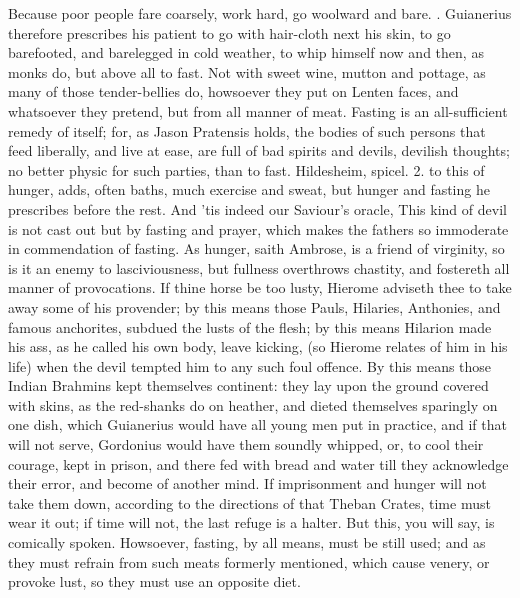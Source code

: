 Because poor people fare coarsely, work hard, go woolward and bare.
 . Guianerius
therefore prescribes his patient to go with hair-cloth next his skin,
to go barefooted, and barelegged in cold weather, to whip himself now
and then, as monks do, but above all to fast. Not with sweet wine,
mutton and pottage, as many of those tender-bellies do, howsoever they
put on Lenten faces, and whatsoever they pretend, but from all manner
of meat. Fasting is an all-sufficient remedy of itself; for, as Jason
Pratensis holds, the bodies of such persons that feed liberally, and
live at ease, are full of bad spirits and devils, devilish
thoughts; no better physic for such parties, than to fast. Hildesheim,
spicel. 2. to this of hunger, adds, often baths, much exercise
and sweat, but hunger and fasting he prescribes before the rest. And
'tis indeed our Saviour's oracle, This kind of devil is not cast out
but by fasting and prayer, which makes the fathers so immoderate in
commendation of fasting. As hunger, saith  Ambrose, is a friend
of virginity, so is it an enemy to lasciviousness, but fullness
overthrows chastity, and fostereth all manner of provocations. If thine
horse be too lusty, Hierome adviseth thee to take away some of his
provender; by this means those Pauls, Hilaries, Anthonies, and famous
anchorites, subdued the lusts of the flesh; by this means Hilarion made
his ass, as he called his own body, leave kicking, (so Hierome
relates of him in his life) when the devil tempted him to any such foul
offence. By this means those Indian Brahmins kept themselves
continent: they lay upon the ground covered with skins, as the
red-shanks do on heather, and dieted themselves sparingly on one dish,
which Guianerius would have all young men put in practice, and if that
will not serve, Gordonius would have them soundly whipped, or, to
cool their courage, kept in prison, and there fed with bread and water
till they acknowledge their error, and become of another mind. If
imprisonment and hunger will not take them down, according to the
directions of that  Theban Crates, time must wear it out; if time
will not, the last refuge is a halter. But this, you will say, is
comically spoken. Howsoever, fasting, by all means, must be still used;
and as they must refrain from such meats formerly mentioned, which
cause venery, or provoke lust, so they must use an opposite diet.
